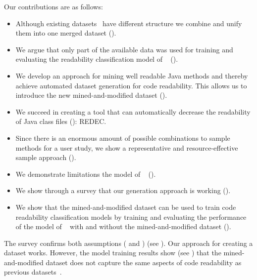 \documentclass[%
class=scrreprt,
chapterprefix=false,%
open=right,%
twoside=false,%
paper=a4,%
logofile={Logo\_zentral\_farbig\_EN.png},%
thesistype=master,%
UKenglish,%
]{se2thesis}
\theoremstyle{definition}
\newcommand{\citeolddataset}{\cite{buse2009learning, dorn2012general, scalabrino2018comprehensive}\xspace}
\newcommand{\rdh}{REDEC\xspace}
\begin{document}
	Our contributions are as follows:
	\begin{itemize}
		\item Although existing datasets~\citeolddataset have different structure we combine and unify them into one merged dataset ().
		\item We argue that only part of the available data was used for training and evaluating the readability classification model of \citeauthor{mi2022towards}~\cite{mi2022towards} ().
		\item We develop an approach for mining well readable Java methods and thereby achieve automated dataset generation for code readability. This allows us to introduce the new mined-and-modified dataset ().
		\item We succeed in creating a tool that can automatically decrease the readability of Java class files (): \rdh.
		\item Since there is an enormous amount of possible combinations to sample methods for a user study, we show a representative and resource-effective sample approach ().
		\item We demonstrate limitations the model of \citeauthor{mi2022towards}~\cite{mi2022towards} ().
		\item We show through a survey that our generation approach is working ().
		\item We show that the mined-and-modified dataset can be used to train code readability classification models by training and evaluating the performance of the model of \citeauthor{mi2022towards}~\cite{mi2022towards} with and without the mined-and-modified dataset ().
	\end{itemize}
	

	
	The survey confirms both assumptions ( and ) (see ).
	Our approach for creating a dataset works. However, the model training results show (see ) that the mined-and-modified dataset does not capture the same aspects of code readability as previous datasets~\citeolddataset.
		
\end{document}
